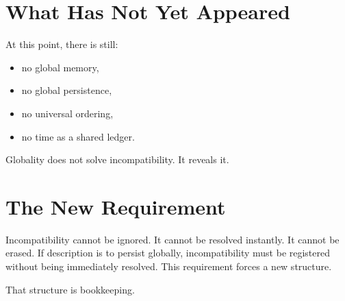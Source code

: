 \documentclass[11pt,twoside,openright]{book}
\begin{document}
\section*{What Has Not Yet Appeared}

At this point, there is still:

\begin{itemize}
\item no global memory,
\item no global persistence,
\item no universal ordering,
\item no time as a shared ledger.
\end{itemize}

Globality does not solve incompatibility. It reveals it.

\section*{The New Requirement}

Incompatibility cannot be ignored. It cannot be resolved instantly. It cannot be erased. If description is to persist globally, incompatibility must be registered without being immediately resolved. This requirement forces a new structure.

That structure is bookkeeping.
\end{document}
